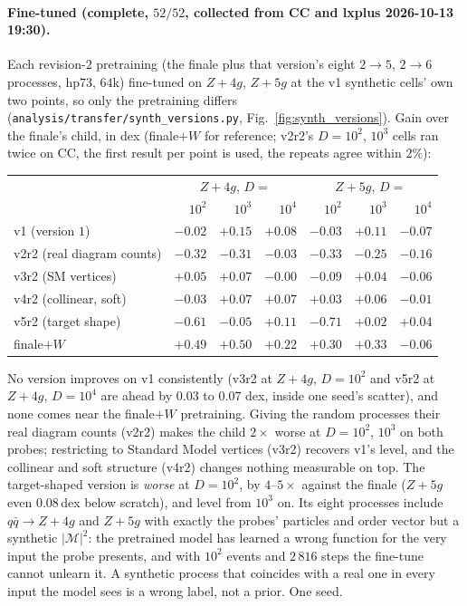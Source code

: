 \documentclass[11pt]{article}
\newcommand{\code}[1]{\texttt{#1}}
\begin{document}
\paragraph{Fine-tuned (complete, $52/52$, collected from CC and lxplus 2026-10-13 19:30).} Each
revision-$2$ pretraining (the finale plus that version's eight $2\to5$, $2\to6$ processes, hp73, $64$k) fine-tuned on
$Z+4g$, $Z+5g$ at the v1 synthetic cells' own two points, so only the pretraining differs
(\code{analysis/transfer/synth\_versions.py}, Fig.~\ref{fig:synth_versions}). Gain over the finale's child, in dex
(finale$+W$ for reference; v2r2's $D=10^2$, $10^3$ cells ran twice on CC, the first result per point is used, the
repeats agree within $2\%$):
\begin{center}\small
\begin{tabular}{l rrr rrr}
 & \multicolumn{3}{c}{$Z+4g$, $D=$} & \multicolumn{3}{c}{$Z+5g$, $D=$} \\
 & $10^2$ & $10^3$ & $10^4$ & $10^2$ & $10^3$ & $10^4$ \\ \hline
v1 (version $1$)  & $-0.02$ & $+0.15$ & $+0.08$ & $-0.03$ & $+0.11$ & $-0.07$ \\
v2r2 (real diagram counts) & $-0.32$ & $-0.31$ & $-0.03$ & $-0.33$ & $-0.25$ & $-0.16$ \\
v3r2 (SM vertices) & $+0.05$ & $+0.07$ & $-0.00$ & $-0.09$ & $+0.04$ & $-0.06$ \\
v4r2 (collinear, soft) & $-0.03$ & $+0.07$ & $+0.07$ & $+0.03$ & $+0.06$ & $-0.01$ \\
v5r2 (target shape) & $-0.61$ & $-0.05$ & $+0.11$ & $-0.71$ & $+0.02$ & $+0.04$ \\ \hline
finale$+W$        & $+0.49$ & $+0.50$ & $+0.22$ & $+0.30$ & $+0.33$ & $-0.06$ \\
\end{tabular}
\end{center}
No version improves on v1 consistently (v3r2 at $Z{+}4g$, $D=10^2$ and v5r2 at $Z{+}4g$, $D=10^4$ are ahead by $0.03$ to $0.07$ dex, inside one seed's scatter), and none comes near the finale$+W$ pretraining. Giving the random processes their real
diagram counts (v2r2) makes the child $2\times$ worse at $D=10^2$, $10^3$ on both probes; restricting to Standard Model
vertices (v3r2) recovers v1's level, and the collinear and soft structure (v4r2) changes nothing measurable on top. The
target-shaped version is \emph{worse} at $D=10^2$, by $4$--$5\times$ against the finale ($Z+5g$ even $0.08$\,dex below
scratch), and level from $10^3$ on. Its eight processes include $q\bar q\to Z+4g$ and $Z+5g$ with exactly the probes'
particles and order vector but a synthetic $|\mathcal M|^2$: the pretrained model has learned a wrong function for the
very input the probe presents, and with $10^2$ events and $2\,816$ steps the fine-tune cannot unlearn it. A synthetic
process that coincides with a real one in every input the model sees is a wrong label, not a prior. One seed.
\end{document}
